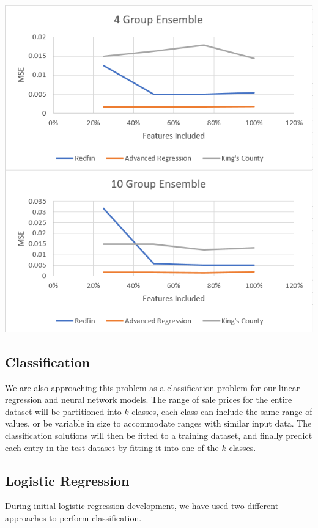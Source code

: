 \documentclass[10pt]{article}
\begin{document}
\begin{multicols}{2}
		\begin{center}
            \captionsetup{type=figure}
			\includegraphics[scale=0.6]{Images/LineEnsembleResults} \\
			\label{fig:linr_ensemble}
		\end{center}

 		\subsection{Classification}
			We are also approaching this problem as a classification problem for our linear regression and neural network models. The range of sale prices for the entire dataset will be partitioned into \(k\) classes, each class can include the same range of values, or be variable in size to accommodate ranges with similar input data. The classification solutions will then be fitted to a training dataset, and finally predict each entry in the test dataset by fitting it into one of the \(k\) classes.

		\subsection{Logistic Regression}
		During initial logistic regression development, we have used two different approaches to perform classification.


\end{multicols}
\end{document}
